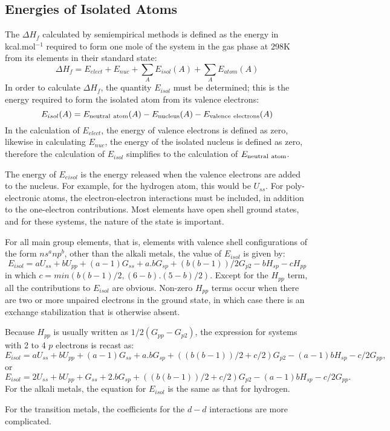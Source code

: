 \subsection{Energies of Isolated Atoms}
The $\Delta H_f$ calculated by semiempirical methods is defined as the  energy
in kcal.mol$^{-1}$ required to form one mole of the system in the gas phase at
298K from its elements in their standard state:
$$
\Delta H_f = E_{elect} + E_{nuc} + \sum_AE_{isol}(A) +\sum_AE_{atom}(A)
$$
In order to calculate $\Delta H_f$, the quantity $E_{isol}$ must be 
determined; this is the energy required to form the isolated atom from its 
valence electrons:
$$
E_{isol}(A)=E_{\rm neutral\ atom}(A) -E_{\rm nucleus}(A)-
E_{\rm valence\ electrons}(A)
$$
In the calculation of $E_{elect}$, the energy of valence electrons is  defined
as zero, likewise in calculating $E_{nuc}$, the energy of the  isolated nucleus
is defined as zero, therefore the calculation of $E_{isol}$ simplifies to the
calculation of $E_{\rm neutral\ atom}$.

The energy of $E_{eisol}$ is the energy released when the valence  electrons
are added to the nucleus.  For example, for the hydrogen atom, this would be 
$U_{ss}$.  For poly-electronic atoms, the electron-electron  interactions must
be included, in addition to the one-electron contributions. Most elements have
open shell ground states, and for these systems, the  nature of the state is
important.

For all main group elements, that is, elements with valence shell
configurations of the form $ns^anp^b$, other than the alkali metals, the value
of $E_{isol}$ is  given by:
$$
E_{isol} =aU_{ss}+bU_{pp}+(a-1)G_{ss}+a.bG_{sp}+(b(b-1))/2G_{p2}-bH_{sp}-
cH_{pp}
$$
in which $c=min(b(b-1)/2,(6-b).(5-b)/2)$.  Except for the $H_{pp}$ term, all
the contributions to $E_{isol}$ are obvious.  Non-zero $H_{pp}$ terms occur
when there are two or more unpaired electrons in the ground state, in  which
case there is an exchange stabilization that is otherwise absent.

Because $H_{pp}$ is usually written as $1/2(G_{pp}-G_{p2})$, the expression 
for systems with 2 to 4 $p$ electrons is recast as:
$$
E_{isol} =aU_{ss}+bU_{pp}+(a-1)G_{ss}+a.bG_{sp}+((b(b-1))/2+c/2)G_{p2}-
(a-1)bH_{sp}-c/2G_{pp},
$$
or
$$
E_{isol} =2U_{ss}+bU_{pp}+G_{ss}+2.bG_{sp}+((b(b-1))/2+c/2)G_{p2}-
(a-1)bH_{sp}-c/2G_{pp}.
$$
For the alkali metals, the equation for $E_{isol}$ is the same as that for 
hydrogen.

For the transition metals, the coefficients for the $d-d$ interactions are more
complicated.


